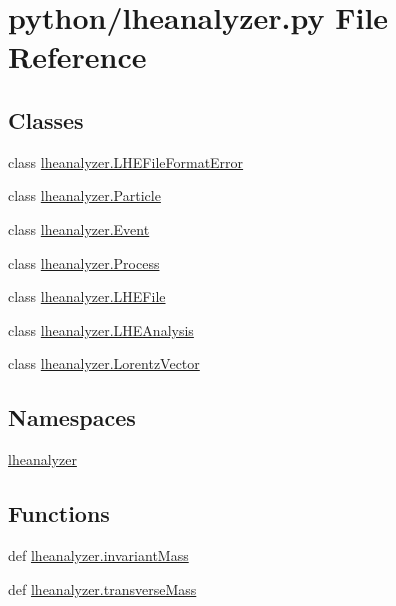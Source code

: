 \section{python/lheanalyzer.py File Reference}
\label{lheanalyzer_8py}
\subsection*{Classes}
\begin{DoxyCompactItemize}
\item 
class \hyperlink{classlheanalyzer_1_1LHEFileFormatError}{lheanalyzer.\-L\-H\-E\-File\-Format\-Error}
\item 
class \hyperlink{classlheanalyzer_1_1Particle}{lheanalyzer.\-Particle}
\item 
class \hyperlink{classlheanalyzer_1_1Event}{lheanalyzer.\-Event}
\item 
class \hyperlink{classlheanalyzer_1_1Process}{lheanalyzer.\-Process}
\item 
class \hyperlink{classlheanalyzer_1_1LHEFile}{lheanalyzer.\-L\-H\-E\-File}
\item 
class \hyperlink{classlheanalyzer_1_1LHEAnalysis}{lheanalyzer.\-L\-H\-E\-Analysis}
\item 
class \hyperlink{classlheanalyzer_1_1LorentzVector}{lheanalyzer.\-Lorentz\-Vector}
\end{DoxyCompactItemize}
\subsection*{Namespaces}
\begin{DoxyCompactItemize}
\item 
\hyperlink{namespacelheanalyzer}{lheanalyzer}
\end{DoxyCompactItemize}
\subsection*{Functions}
\begin{DoxyCompactItemize}
\item 
def \hyperlink{namespacelheanalyzer_ac56286ded5530897c81cc13b79edfd59}{lheanalyzer.\-invariant\-Mass}
\item 
def \hyperlink{namespacelheanalyzer_a6df98e94a3f636714f10f2a388d1b13d}{lheanalyzer.\-transverse\-Mass}
\end{DoxyCompactItemize}
